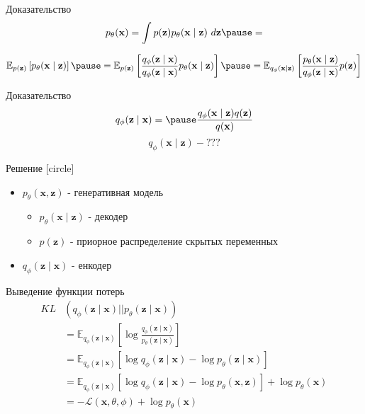 \documentclass{beamer}
\begin{document}
    \begin{frame}{Доказательство}{}
        $$p_\theta(\mathbf{x}) = \int p(\mathbf{z}) p_{\theta}(\mathbf{x} \mid \mathbf{z}) ~d\mathbf{z} \pause = $$
        
        $$\mathbb{E}_{p(\mathbf{z})} \left[p_\theta(\mathbf{x} \mid \mathbf{z})\right] \pause =
          \mathbb{E}_{p(\mathbf{z})} \left[\frac{q_\phi(\mathbf{z} \mid \mathbf{x})}{{q_\phi(\mathbf{z} \mid \mathbf{x})}} p_\theta(\mathbf{x} \mid \mathbf{z}) \right] \pause =
          \mathbb{E}_{q_\phi(\mathbf{x} \mid \mathbf{z})} \left[\frac{p_\theta(\mathbf{x} \mid \mathbf{z})}{q_\phi(\mathbf{z} \mid \mathbf{x})} p(\mathbf{z})\right]
        $$
    \end{frame}

    \begin{frame}{Доказательство}{}
        $$q_\phi(\mathbf{z} \mid \mathbf{x}) = \pause \frac{q_\phi(\mathbf{x} \mid \mathbf{z}) q(\mathbf{z})}{q(\mathbf{x})}$$
        \pause
        $$q_\phi (\mathbf{x} \mid \mathbf{z}) - ???$$
    \end{frame}

    \begin{frame}{Решение}{}
        [circle]
        \begin{itemize}
        \item $p_\theta(\mathbf{x}, \mathbf{z})$ - генеративная модель
            \begin{itemize}
               \item $p_\theta(\mathbf{x} \mid \mathbf{z})$ - декодер
               \item $p(\mathbf{z})$ - приорное распределение скрытых переменных
            \end{itemize}
        \item $q_\phi(\mathbf{z} \mid \mathbf{x})$ - енкодер
        \end{itemize}
    \end{frame}

    \begin{frame}{Выведение функции потерь}{}
        \begin{align*}
        KL &\left(q_\phi(\mathbf{z} \mid \mathbf{x}) || p_\theta(\mathbf{z} \mid \mathbf{x})\right)\\
        &=\mathbb{E}_{q_\phi(\mathbf{z} \mid \mathbf{x})} \left[\log \frac{q_\phi(\mathbf{z} \mid \mathbf{x})}{p_\theta(\mathbf{z} \mid \mathbf{x})}\right]\\
        &=\mathbb{E}_{q_\phi(\mathbf{z} \mid \mathbf{x})} \left[ \log q_\phi(\mathbf{z} \mid \mathbf{x}) - \log p_\theta(\mathbf{z} \mid \mathbf{x})\right]\\
        &=\mathbb{E}_{q_\phi(\mathbf{z} \mid \mathbf{x})}  \left[ \log q_\phi(\mathbf{z} \mid \mathbf{x}) - \log p_\theta(\mathbf{x}, \mathbf{z})\right] + \log p_\theta(\mathbf{x})\\
        &= -\mathcal{L}(\mathbf{x}, \theta, \phi) + \log p_\theta(\mathbf{x})
        \end{align*}
    \end{frame}
\end{document}
